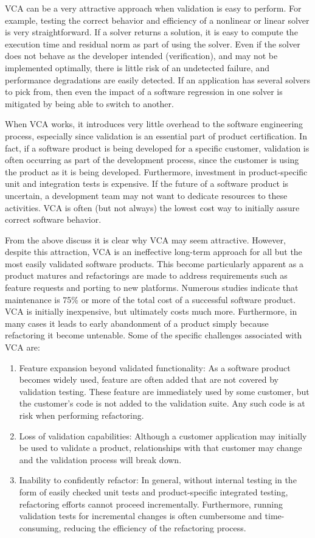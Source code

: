 \documentclass[11pt]{SANDreport}
\begin{document}
VCA can be a very attractive approach when validation is easy to perform.  For example, testing the correct behavior and efficiency of a nonlinear or linear solver is very straightforward.  If a solver returns a solution, it is easy to compute the execution time and residual norm as part of using the solver.  Even if the solver does not behave as the developer intended (verification), and may not be implemented optimally, there is little risk of an undetected failure, and performance degradations are easily detected.   If an application has several solvers to pick from, then even the impact of a software regression in one solver is mitigated by being able to switch to another.

When VCA works, it introduces very little overhead to the software engineering process, especially since validation is an essential part of product certification.  In fact, if a software product is being developed for a specific customer, validation is often occurring as part of the development process, since the customer is using the product as it is being developed.  Furthermore, investment in product-specific unit and integration tests is expensive.  If the future of a software product is uncertain, a development team may not want to dedicate resources to these activities.  VCA is often (but not always) the lowest cost way to initially assure correct software behavior.

From the above discuss it is clear why VCA may seem attractive.  However, despite this attraction, VCA is an ineffective long-term approach for all but the most easily validated software products.  This become particularly apparent as a product matures and refactorings are made to address requirements such as feature requests and porting to new platforms.  Numerous studies indicate that maintenance is 75\% or more of the total cost of a successful software product.  VCA is initially inexpensive, but ultimately costs much more.  Furthermore, in many cases it leads to early abandonment of a product simply because refactoring it become untenable.  Some of the specific challenges associated with VCA are:
\begin{enumerate}
\item Feature expansion beyond validated functionality:  As a software product becomes widely used, feature are often added that are not covered by validation testing.  These feature are immediately used by some customer, but the customer's code is not added to the validation suite.  Any such code is at risk when performing refactoring.
\item Loss of validation capabilities:  Although a customer application may initially be used to validate a product, relationships with that customer may change and the validation process will break down.
\item Inability to confidently refactor:  In general, without internal testing in the form of easily checked unit tests and product-specific integrated testing, refactoring efforts cannot proceed incrementally.  Furthermore, running validation tests for incremental changes is often cumbersome and time-consuming, reducing the efficiency of the refactoring process.
\end{enumerate}
\end{document}
